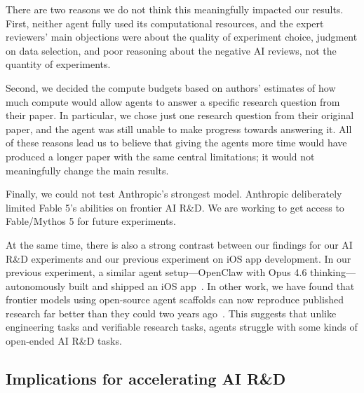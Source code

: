 There are two reasons we do not think this meaningfully impacted our results.
First, neither agent fully used its computational resources, and the expert
reviewers' main objections were about the quality of experiment choice,
judgment on data selection, and poor reasoning about the negative AI reviews,
not the quantity of experiments.

Second, we decided the compute budgets based on authors' estimates of how much
compute would allow agents to answer a specific research question from their
paper. In particular, we chose just one research question from their original
paper, and the agent was still unable to make progress towards answering it.
All of these reasons lead us to believe that giving the agents more time would
have produced a longer paper with the same central limitations; it would not meaningfully change the main results.

Finally, we could not test Anthropic's strongest model. Anthropic deliberately
limited Fable 5's abilities on frontier AI R\&D. We are working to get access
to Fable/Mythos 5 for future experiments.

At the same time, there is also a strong contrast between our findings for our
AI R\&D experiments and our previous experiment on iOS app development. In our
previous experiment, a similar agent setup---OpenClaw with Opus 4.6
thinking---autonomously built and shipped an iOS app~\citep{openworldevals}. In other
work, we have found that frontier models using open-source agent scaffolds can
now reproduce published research far better than they could two years
ago~\citep{cruxrepro}. This suggests that unlike engineering tasks and
verifiable research tasks, agents struggle with some kinds of open-ended AI
R\&D tasks.


\subsection{Implications for accelerating AI R\&D}

